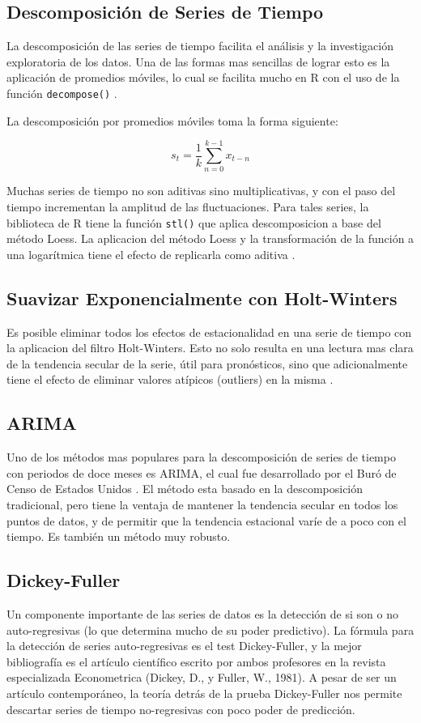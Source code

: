 \documentclass[letterpaper, spanish, 11pt]{report}
\begin{document}
\subsection{Descomposición de Series de Tiempo}
La descomposición de las series de tiempo facilita el análisis y la investigación exploratoria de los datos. Una de las formas mas sencillas de lograr esto es la aplicación de promedios móviles, lo cual se facilita mucho en R con el uso de la función \texttt{decompose()} \cite{daroczi}.

La descomposición por promedios móviles toma la forma siguiente:

\[ s_{t} = \frac{1}{k} \sum_{n = 0}^{k - 1} x_{t - n}  \]

Muchas series de tiempo no son aditivas sino multiplicativas, y con el paso del tiempo incrementan la amplitud de las fluctuaciones. Para tales series, la biblioteca de R tiene la función \texttt{stl()} que aplica descomposicion a base del método Loess. La aplicacion del método Loess y la transformación de la función a una logarítmica tiene el efecto de replicarla como aditiva \cite{viswanathan}.

\subsection{Suavizar Exponencialmente con Holt-Winters}
Es posible eliminar todos los efectos de estacionalidad en una serie de tiempo con la aplicacion del filtro Holt-Winters. Esto no solo resulta en una lectura mas clara de la tendencia secular de la serie, útil para pronósticos, sino que adicionalmente tiene el efecto de eliminar valores atípicos (outliers) en la misma \cite{daroczi}.

\subsection{ARIMA}
Uno de los métodos mas populares para la descomposición de series de tiempo con periodos de doce meses es ARIMA, el cual fue desarrollado por el Buró de Censo de Estados Unidos \cite{hyndman}. El método esta basado en la descomposición tradicional, pero tiene la ventaja de mantener la tendencia secular en todos los puntos de datos, y de permitir que la tendencia estacional varíe de a poco con el tiempo. Es también un método muy robusto.

\subsection{Dickey-Fuller} 
Un componente importante de las series de datos es la detección de si son o no auto-regresivas (lo que determina mucho de su poder predictivo). La fórmula para la detección de series auto-regresivas es el test Dickey-Fuller, y la mejor bibliografía es el artículo científico escrito por ambos profesores en la revista especializada Econometrica (Dickey, D., y Fuller, W., 1981). A pesar de ser un artículo contemporáneo, la teoría detrás de la prueba Dickey-Fuller nos permite descartar series de tiempo no-regresivas con poco poder de predicción. 
\end{document}
